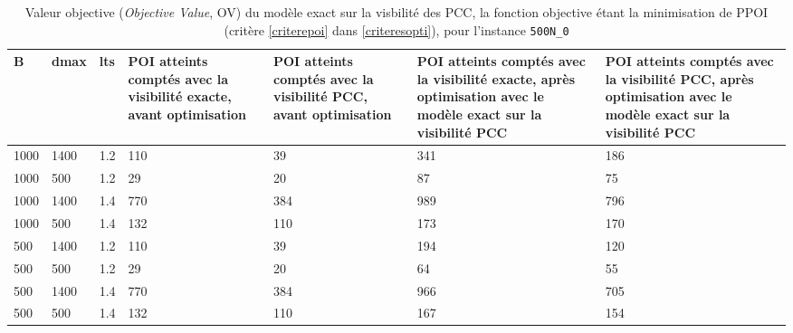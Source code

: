 \renewcommand{\tabularxcolumn}[1]{>{\centering\arraybackslash}m{#1}}

\begin{table}[ht]
\centering
\caption{Valeur objective (\emph{Objective Value}, OV) du modèle exact sur la visbilité des PCC, la fonction objective étant la minimisation de PPOI (critère \ref{criterepoi} dans \ref{criteresopti}), pour l'instance \texttt{500N\_0}}
\vspace{0.5cm}
\begin{tabular}{|l|l|l|p{2cm}|p{2cm}|p{3cm}|p{3cm}|}
\hline
B & dmax & lts & POI atteints comptés avec la
visibilité exacte, avant
optimisation & POI atteints comptés avec la
visibilité PCC, avant  optimisation & POI atteints comptés avec la visibilité exacte, après optimisation avec le modèle exact sur la visibilité PCC & POI atteints comptés avec la visibilité PCC, après optimisation avec le modèle exact sur la visibilité PCC\\
\hline
1000 & 1400 & 1.2 & 110 & 39 & 341 & 186 \\
1000 & 500 & 1.2 & 29 & 20 & 87 & 75 \\
1000 & 1400 & 1.4 & 770 & 384 & 989 & 796 \\
1000 & 500 & 1.4 & 132 & 110 & 173 & 170 \\
500 & 1400 & 1.2 & 110 & 39 & 194 & 120 \\
500 & 500 & 1.2 & 29 & 20 & 64 & 55 \\
500 & 1400 & 1.4 & 770 & 384 & 966 & 705 \\
500 & 500 & 1.4 & 132 & 110 & 167 & 154 \\
\hline
\end{tabular}
\label{tab:nbppoi}
\end{table}

